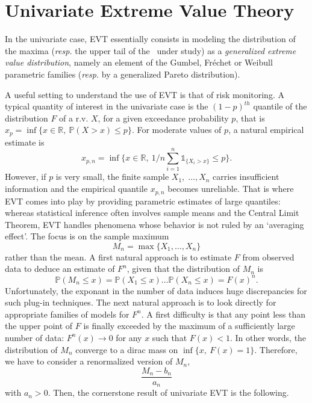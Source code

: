 \section{Univariate Extreme Value Theory}
\label{back:sec:1EVT} 
In the univariate case, \textsc{EVT} essentially consists in modeling
the distribution of the maxima ({\it resp.} the upper tail of the \rv~under study) as a {\it generalized
extreme value distribution}, namely an element of the Gumbel, Fr\'echet
or Weibull parametric families ({\it resp.} by a generalized Pareto distribution).

A useful setting to understand the use of EVT is that of risk monitoring. A typical quantity of interest in the univariate case is the $(1-p)^{th}$
quantile of the distribution  $F$ of a r.v. $X$,  for a given exceedance probability $p$, that is
$x_p = \inf\{x \in \mathbb{R},~ \mathbb{P}(X > x) \le p\}$. For
moderate values of $p$, a natural empirical estimate is  $$x_{p,n} = \inf\{x \in
\mathbb{R},~ 1/n \sum_{i=1}^n \mathds{1}_{\{X_i > x\}}\le p\}.$$
However,  if $p$ is very small, the finite  sample $X_1,\; \ldots, X_n$  carries insufficient information and the empirical quantile $x_{p,n}$ becomes unreliable. 
That is where \textsc{EVT} comes into play  by providing parametric estimates of large
quantiles: %
whereas statistical inference often involves sample means and the
Central Limit Theorem, %
\textsc{EVT} handles phenomena whose behavior is %
not ruled by an `averaging effect'. The focus is on the sample maximum $$M_n = \max\{X_1,\ldots,X_n\}$$
rather than the mean. A first natural approach is to estimate $F$ from observed data to deduce an estimate of $F^n$, given that the distribution of $M_n$ is
$$\mathbb{P}(M_n \le x) = \mathbb{P}(X_1 \le x) \ldots \mathbb{P}(X_n \le x) = F(x)^n.$$
Unfortunately, the exponant in the number of data induces huge discrepancies for such plug-in techniques. The next natural approach is to look directly for appropriate families of models for $F^n$.
A first difficulty is that any point less than the upper point of $F$ is finally exceeded by the maximum of a sufficiently large number of data: $F^n(x) \to 0$ for any $x$ such that $F(x) < 1$. In other words, the distribution of $M_n$ converge to a dirac mass on $\inf\{x,~F(x)=1\}$. Therefore, we have to consider a renormalized version of $M_n$, $$\frac{M_n-b_n}{a_n} $$ with $a_n>0$.
Then, the cornerstone result of univariate EVT is the following.

